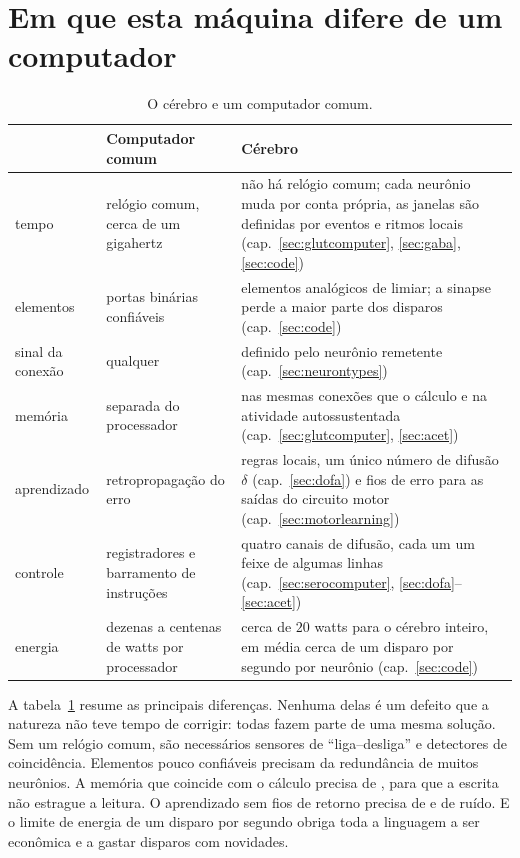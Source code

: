 \section{Em que esta máquina difere de um computador}

\begin{table}[t]
\centering
\footnotesize
\setlength{\tabcolsep}{4pt}
\renewcommand{\arraystretch}{1.15}
\begin{tabular}{>{\raggedright}p{2.2cm}>{\raggedright}p{4.2cm}>{\raggedright\arraybackslash}p{6.6cm}}
\toprule
& Computador comum & Cérebro \\
\midrule
tempo & relógio comum, cerca de um gigahertz & não há relógio comum; cada neurônio muda por conta própria, as janelas são definidas por eventos e ritmos locais (cap.~\ref{sec:glutcomputer}, \ref{sec:gaba}, \ref{sec:code}) \\
elementos & portas binárias confiáveis & elementos analógicos de limiar; a sinapse perde a maior parte dos disparos (cap.~\ref{sec:code}) \\
sinal da conexão & qualquer & definido pelo neurônio remetente (cap.~\ref{sec:neurontypes}) \\
memória & separada do processador & nas mesmas conexões que o cálculo e na atividade autossustentada (cap.~\ref{sec:glutcomputer}, \ref{sec:acet}) \\
aprendizado & retropropagação do erro & regras locais, um único número de difusão $\delta$ (cap.~\ref{sec:dofa}) e fios de erro para as saídas do circuito motor (cap.~\ref{sec:motorlearning}) \\
controle & registradores e barramento de instruções & quatro canais de difusão, cada um um feixe de algumas linhas (cap.~\ref{sec:serocomputer}, \ref{sec:dofa}--\ref{sec:acet}) \\
energia & dezenas a centenas de watts por processador & cerca de $20$ watts para o cérebro inteiro, em média cerca de um disparo por segundo por neurônio (cap.~\ref{sec:code}) \\
\bottomrule
\end{tabular}
\caption{O cérebro e um computador comum.}
\label{tab:computer}
\end{table}

A tabela~\ref{tab:computer} resume as principais diferenças. Nenhuma delas é um defeito que a natureza não teve tempo de corrigir: todas fazem parte de uma mesma solução. Sem um relógio comum, são necessários sensores de ``liga--desliga'' e detectores de coincidência. Elementos pouco confiáveis precisam da redundância de muitos neurônios. A memória que coincide com o cálculo precisa de , para que a escrita não estrague a leitura. O aprendizado sem fios de retorno precisa de  e de ruído. E o limite de energia de um disparo por segundo obriga toda a linguagem a ser econômica e a gastar disparos com novidades.

